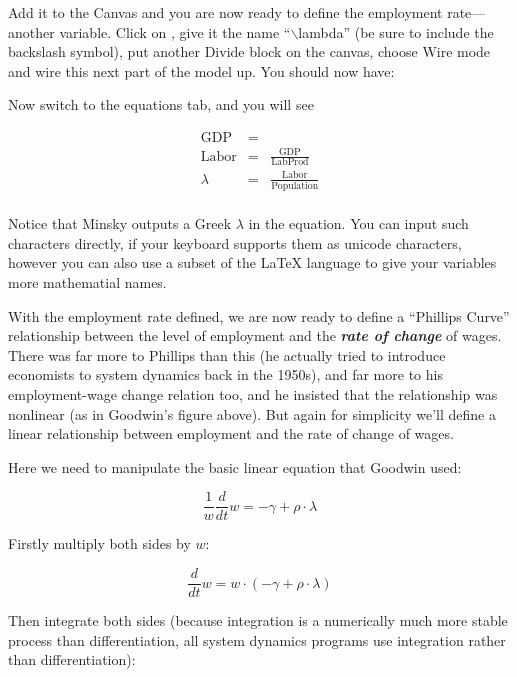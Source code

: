 Add it to the Canvas and you are now ready to define the employment
rate---another variable. Click on , give it
the name ``$\backslash$lambda'' (be sure to include the backslash symbol), put
another Divide block on the canvas, choose Wire mode and wire this
next part of the model up. You should now have:



Now switch to the equations tab, and you will see

\begin{eqnarray*}
\mathrm{GDP}&=&\\
\mathrm{Labor}&=&\frac{\mathrm{GDP}}{\mathrm{LabProd}}\\
\lambda&=&\frac{\mathrm{Labor}}{\mathrm{Population}}\\
\end{eqnarray*}

Notice that Minsky outputs a Greek $\lambda$ in the equation. You can
input such characters directly, if your keyboard supports them as unicode
characters, however you can also use a subset of the LaTeX language to give
your variables more mathematial names.


With the employment rate defined, we are now ready to define a
``Phillips Curve'' relationship between the level of employment and the
{\em\bf rate of change} of wages. There was far more to Phillips than this (he
actually tried to introduce economists to system dynamics back in the
1950s), and far more to his employment-wage change relation too, and
he insisted that the relationship was nonlinear (as in Goodwin's
figure above). But again for simplicity we'll define a linear
relationship between employment and the rate of change of wages. 

Here we need to manipulate the basic linear equation that Goodwin used:

\begin{displaymath}
\frac1w\frac d{dt}w = -\gamma+\rho\cdot\lambda
\end{displaymath}

Firstly multiply both sides by $w$:

\begin{displaymath}
\frac d{dt}w = w\cdot(-\gamma+\rho\cdot\lambda)
\end{displaymath}

Then integrate both sides (because integration is a numerically much
more stable process than differentiation, all system dynamics programs
use integration rather than differentiation): 

